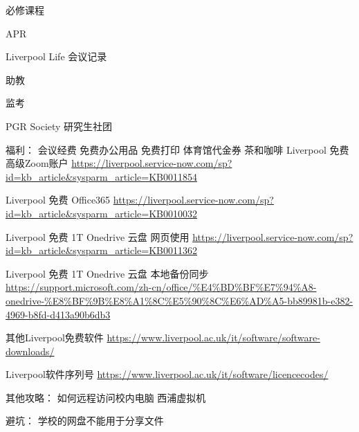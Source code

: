\begin{overview}
\thispagestyle{empty}

必修课程

APR

Liverpool Life 会议记录

助教

监考

PGR Society 研究生社团

福利：
会议经费
免费办公用品
免费打印
体育馆代金券
茶和咖啡
Liverpool 免费高级Zoom账户 
\url{https://liverpool.service-now.com/sp?id=kb_article&sysparm_article=KB0011854}

Liverpool 免费 Office365
\url{https://liverpool.service-now.com/sp?id=kb_article&sysparm_article=KB0010032}

Liverpool 免费 1T Onedrive 云盘 网页使用
\url{https://liverpool.service-now.com/sp?id=kb_article&sysparm_article=KB0011362}

Liverpool 免费 1T Onedrive 云盘 本地备份同步
\url{https://support.microsoft.com/zh-cn/office/%E4%BD%BF%E7%94%A8-onedrive-%E8%BF%9B%E8%A1%8C%E5%90%8C%E6%AD%A5-bb89981b-e382-4969-b8fd-d413a90b6db3}

其他Liverpool免费软件
\url{https://www.liverpool.ac.uk/it/software/software-downloads/}

Liverpool软件序列号
\url{https://www.liverpool.ac.uk/it/software/licencecodes/}

其他攻略：
如何远程访问校内电脑
西浦虚拟机

避坑：
学校的网盘不能用于分享文件


\end{overview}

